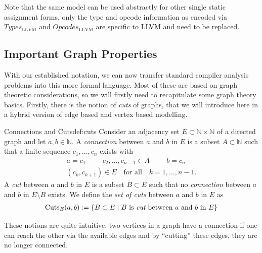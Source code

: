     Note that the same model can be used abstractly for other single static
    assignment forms, only the type and opcode information as encoded via
    $Types_\text{LLVM}$ and $Opcodes_\text{LLVM}$ are specific to LLVM and need
    to be replaced.

\newpage

\subsection{Important Graph Properties}

    With our established notation, we can now transfer standard compiler
    analysis problems into this more formal language.
    Most of these are based on graph theoretic considerations, so we
    will firstly need to recapitulate some graph theory basics.
    Firstly, there is the notion of {\em cuts} of graphs, that we will introduce
    here in a hybrid version of edge based and vertex based modelling.

    \begin{definition}{Connections and Cuts}{def:cuts}
        Consider an adjacency set $E\subset\mathbb{N}\times\mathbb{N}$ of a
        directed graph and let $a,b\in\mathbb{N}$.
        \newline
        A {\em connection} between $a$ and $b$ in $E$ is a subset
        $A\subset\mathbb{N}$ such that a finite sequence $c_1,\dots,c_n$
        exists with
        \begin{gather*}
            a=c_1\hspace{1cm}c_2,\dots,c_{n-1}\in A\hspace{1cm}b=c_n\\
            (c_k,c_{k+1})\in E\hspace{1em}\text{for all}\hspace{1em}k=1,\dots,n-1.
        \end{gather*}
        A {\em cut} between $a$ and $b$ in $E$ is a subset $B\subset E$
        such that no {\em connection} between $a$ and $b$ in $E\setminus B$
        exists.
        We define the {\em set of cuts} between $a$ and $b$ in $E$ as
        \begin{align*}
            \text{Cuts}_E(a,b):=\{B\subset E\mid B\text{ is {\em cut} between $a$ and $b$ in $E$}\}
        \end{align*}
    \end{definition}

    These notions are quite intuitive, two vertices in a graph have a connection
    if one can reach the other via the available edges and by ``cutting'' these
    edges, they are no longer connected.

